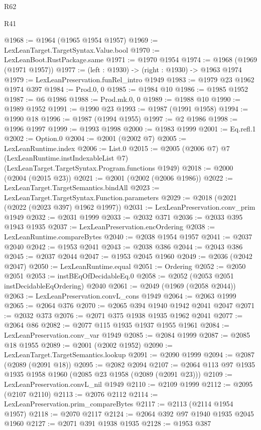 \begin{lexlean}{R62}
\begin{lexlean}{R41}
\begin{coremodule}
{{{{{{{{{{{{{{{{{{{{{{{{{{{{{{{{{{{{{{{{{{{{{{{{{{{{{{{{{{{{{{{{{{{{{{{{{{{{{{{{{{{{{{{@1968 := @1964 (@1965 @1954 @1957)
@1969 := LexLeanTarget.TargetSyntax.Value.bool
@1970 := LexLeanBoot.RustPackage.same
@1971 := @1970 @1954
@1974 := @1968 (@1969 (@1971 @1957))
@1977 := (left : @1930) -> (right : @1930) -> @1963 @1974
@1979 := LexLeanPreservation.funRel_intro @1949
@1983 := @1979 @23 @1962 @1974 @397
@1984 := Prod.{0, 0}
@1985 := @1984 @10
@1986 := @1985 @1952
@1987 := @6 @1986
@1988 := Prod.mk.{0, 0}
@1989 := @1988 @10
@1990 := @1989 @1952
@1991 := @1990 @23
@1993 := @1987 (@1991 @1958)
@1994 := @1990 @18
@1996 := @1987 (@1994 @1955)
@1997 := @2 @1986
@1998 := @1996 @1997
@1999 := @1993 @1998
@2000 := @1983 @1999
@2001 := Eq.refl.{1}
@2002 := Option.{0}
@2004 := @2001 (@2002 @7)
@2005 := LexLeanRuntime.index
@2006 := List.{0}
@2015 := @2005
    (@2006 @7)
    @7
    (LexLeanRuntime.instIndexableList @7)
    (LexLeanTarget.TargetSyntax.Program.functions @1949)
@2018 := @2000 (@2004 (@2015 @23))
@2021 := @2001 (@2002 (@2006 @1986))
@2022 := LexLeanTarget.TargetSemantics.bindAll
@2023 := LexLeanTarget.TargetSyntax.Function.parameters
@2029 := @2018 (@2021 (@2022 (@2023 @397) @1962 @1997))
@2031 := LexLeanPreservation.conv_prim @1949
@2032 := @2031 @1999
@2033 := @2032 @371
@2036 := @2033 @395 @1943 @1935
@2037 := LexLeanPreservation.encOrdering
@2038 := LexLeanRuntime.compareBytes
@2040 := @2038 @1954 @1957
@2041 := @2037 @2040
@2042 := @1953 @2041
@2043 := @2038 @386
@2044 := @2043 @386
@2045 := @2037 @2044
@2047 := @1953 @2045 @1960
@2049 := @2036 (@2042 @2047)
@2050 := LexLeanRuntime.equal
@2051 := Ordering
@2052 := @2050 @2051
@2053 := instBEqOfDecidableEq.{0}
@2058 := @2052 (@2053 @2051 instDecidableEqOrdering) @2040
@2061 := @2049 (@1969 (@2058 @2044))
@2063 := LexLeanPreservation.convL_cons @1949
@2064 := @2063 @1999
@2065 := @2064 @376
@2070 := @2065 @394 @1940 @1942 @2041 @2047
@2071 := @2032 @373
@2076 := @2071 @375 @1938 @1935 @1962 @2041
@2077 := @2064 @86
@2082 := @2077 @115 @1935 @1937 @1955 @1961
@2084 := LexLeanPreservation.conv_var @1949
@2085 := @2084 @1999
@2087 := @2085 @18 @1955
@2089 := @2001 (@2002 @1952)
@2090 := LexLeanTarget.TargetSemantics.lookup
@2091 := @2090 @1999
@2094 := @2087 (@2089 (@2091 @18))
@2095 := @2082 @2094
@2107 := @2064 @113 @97 @1935 @1935 @1958 @1960 (@2085 @23 @1958 (@2089 (@2091 @23)))
@2109 := LexLeanPreservation.convL_nil @1949
@2110 := @2109 @1999
@2112 := @2095 (@2107 @2110)
@2113 := @2076 @2112
@2114 := LexLeanPreservation.prim_compareBytes
@2117 := @2113 (@2114 @1954 @1957)
@2118 := @2070 @2117
@2124 := @2064 @392 @97 @1940 @1935 @2045 @1960
@2127 := @2071 @391 @1938 @1935
@2128 := @1953 @387
}}}}}}}}}}}}}}}}}}}}}}}}}}}}}}}}}}}}}}}}}}}}}}}}}}}}}}}}}}}}}}}}}}}}}}}}}}}}}}}}}}}}}}}
\end{coremodule}
\end{lexlean}
\end{lexlean}
